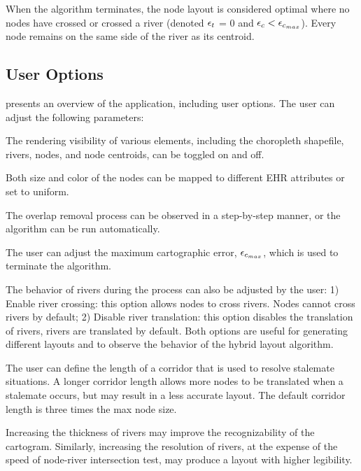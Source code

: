 When the algorithm terminates, the node layout is considered optimal where no nodes have crossed or crossed a river (denoted $ \epsilon_{t} $ = 0 and $ \epsilon_{c} < \epsilon_{c_{max}} $). Every node remains on the same side of the river as its centroid.

\subsection{User Options}\label{subsec:{UserOptions}}

 presents an overview of the application, including user options. The user can adjust the following parameters:

 The rendering visibility of various elements, including the choropleth shapefile, rivers, nodes, and node centroids, can be toggled on and off.

 Both size and color of the nodes can be mapped to different EHR attributes or set to uniform.

 The overlap removal process can be observed in a step-by-step manner, or the algorithm can be run automatically. 

 The user can adjust the maximum cartographic error, $ \epsilon_{c_{max}} $, which is used to terminate the algorithm.

 The behavior of rivers during the process can also be adjusted by the user: 1) Enable river crossing: this option allows nodes to cross rivers. Nodes cannot cross rivers by default; 2) Disable river translation: this option disables the translation of rivers, rivers are translated by default. Both options are useful for generating different layouts and to observe the behavior of the hybrid layout algorithm.

 The user can define the length of a corridor that is used to resolve stalemate situations. A longer corridor length allows more nodes to be translated when a stalemate occurs, but may result in a less accurate layout. The default corridor length is three times the max node size.

 Increasing the thickness of rivers may improve the recognizability of the cartogram. Similarly, increasing the resolution of rivers, at the expense of the speed of node-river intersection test, may produce a layout with higher legibility.


